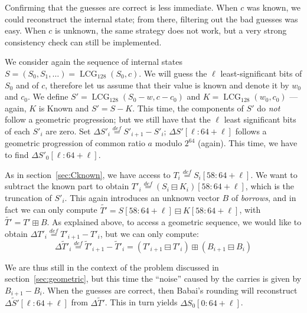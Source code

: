 \documentclass[submission,svgnames,journal=tosc]{iacrtrans}
\DeclareMathOperator{\LCG}{LCG}
\begin{document}
Confirming that the guesses are correct is less immediate. When $c$ was known,
we could reconstruct the internal state; from there, filtering out the bad
guesses was easy. When $c$ is unknown, the same strategy does not work, but a
very strong consistency check can still be implemented. %

We consider again the sequence of internal states
$S = (S_0, S_1, \dots) = \LCG_{128}(S_0, c)$. We will guess the $\ell$
least-significant bits of $S_0$ and of $c$, therefore let us assume that their
value is known and denote it by $w_0$ and $c_0$. We define
$S' = \LCG_{128}(S_0 - w, c - c_0)$ and $K = \LCG_{128}(w_0, c_0)$ --- again,
$K$ is Known and $S' = S - K$. This time, the components of $S'$ do \emph{not}
follow a geometric progression; but we still have that the $\ell$ least
significant bits of each $S'_i$ are zero. Set
$\Delta S'_i \stackrel{def}{=} S'_{i+1} - S'_i$; $\Delta S'[\ell:64+\ell]$
follows a geometric progression of common ratio $a$ modulo $2^{64}$
(again). This time, we have to find $\Delta S'_0[\ell:64+\ell]$.

As in section~\ref{sec:Cknown}, we have access to
$T_i \stackrel{def}{=} S_i[58:64+\ell]$. We want to subtract the known part to
obtain $T'_i \stackrel{def}{=} (S_i \boxminus K_i)[58:64+\ell]$, which is the
truncation of $S'_i$. This again introduces an unknown vector $B$ of
\emph{borrows}, and in fact we can only compute
$\widetilde{T'} = S[58:64+\ell] \boxminus K[58:64+\ell]$, with
$\widetilde{T'} = T' \boxplus B$. As explained above, to access a geometric
sequence, we would like to obtain
$\Delta T'_i \stackrel{def}{=} T'_{i+1} - T'_i$, but we can only compute:
\[
  \Delta \widetilde{T}'_i \stackrel{def}{=} \widetilde{T}'_{i+1} - \widetilde{T}'_i
  =  (T'_{i+1} \boxminus T'_{i}) \boxplus (B_{i+1} \boxminus B_{i})
\]

We are thus still in the context of the problem discussed in
section~\ref{sec:geometric}, but this time the ``noise'' caused by the carries
is given by $B_{i+1} - B_i$. When the guesses are correct, then Babai's rounding
will reconstruct $\Delta \widetilde{S}'[\ell:64+\ell]$ from
$\Delta \widetilde{T}'$. This in turn yields $\Delta S_0[0:64+\ell]$.
\end{document}
